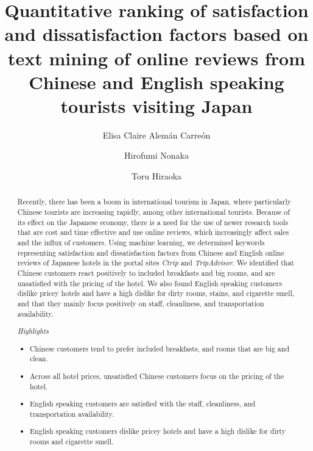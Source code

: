 \documentclass[review]{elsarticle}
\begin{document}
\begin{frontmatter}

\title{Quantitative ranking of satisfaction and dissatisfaction factors based on text mining of online reviews from Chinese and English speaking tourists visiting Japan}

\author[gidai]{Elisa Claire Alemán Carreón
}

\author[gidai]{Hirofumi Nonaka}

\author[nagasaki]{Toru Hiraoka}

\address[gidai]{Nagaoka University of Technology, Nagaoka, Japan}
\address[nagasaki]{University of Nagasaki, Nagasaki, Japan}


\begin{abstract}
Recently, there has been a boom in international tourism in Japan, where particularly Chinese tourists are increasing rapidly, among other international tourists. Because of its effect on the Japanese economy, there is a need for the use of newer research tools that are cost and time effective and use online reviews, which increasingly affect sales and the influx of customers. Using machine learning, we determined keywords representing satisfaction and dissatisfaction factors from Chinese and English online reviews of Japanese hotels in the portal sites \textit{Ctrip} and \textit{TripAdvisor}. We identified that Chinese customers react positively to included breakfasts and big rooms, and are unsatisfied with the pricing of the hotel. We also found English speaking customers dislike pricey hotels and have a high dislike for dirty rooms, stains, and cigarette smell, and that they mainly focus positively on staff, cleanliness, and transportation availability.

\medskip
\noindent\it{Highlights}
\begin{itemize}
    \item Chinese customers tend to prefer included breakfasts, and rooms that are big and clean.
    \item Across all hotel prices, unsatisfied Chinese customers focus on the pricing of the hotel.
    \item English speaking customers are satisfied with the staff, cleanliness, and transportation availability.
    \item English speaking customers dislike pricey hotels and have a high dislike for dirty rooms and cigarette smell.
\end{itemize}


\end{abstract}
\end{frontmatter}
\end{document}
